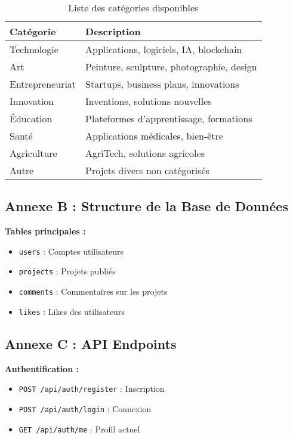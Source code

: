 \documentclass[12pt,a4paper]{article}
\begin{document}
\begin{table}[h]
\centering
\begin{tabular}{|l|l|}
\hline
\textbf{Catégorie} & \textbf{Description} \\ \hline
Technologie & Applications, logiciels, IA, blockchain \\ \hline
Art & Peinture, sculpture, photographie, design \\ \hline
Entrepreneuriat & Startups, business plans, innovations \\ \hline
Innovation & Inventions, solutions nouvelles \\ \hline
Éducation & Plateformes d'apprentissage, formations \\ \hline
Santé & Applications médicales, bien-être \\ \hline
Agriculture & AgriTech, solutions agricoles \\ \hline
Autre & Projets divers non catégorisés \\ \hline
\end{tabular}
\caption{Liste des catégories disponibles}
\end{table}

\subsection*{Annexe B : Structure de la Base de Données}

\textbf{Tables principales :}

\begin{itemize}[leftmargin=*]
    \item \texttt{users} : Comptes utilisateurs
    \item \texttt{projects} : Projets publiés
    \item \texttt{comments} : Commentaires sur les projets
    \item \texttt{likes} : Likes des utilisateurs
\end{itemize}

\subsection*{Annexe C : API Endpoints}

\textbf{Authentification :}
\begin{itemize}[leftmargin=*]
    \item \texttt{POST /api/auth/register} : Inscription
    \item \texttt{POST /api/auth/login} : Connexion
    \item \texttt{GET /api/auth/me} : Profil actuel
\end{itemize}
\end{document}
